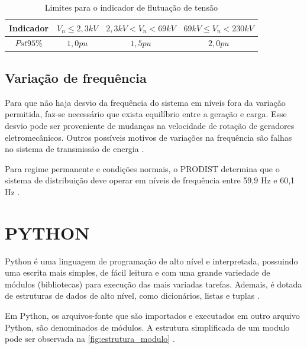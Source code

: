 \begin{table}[H]
  \centering
  \caption{Limites para o indicador de flutuação de tensão}
  \label{tab:limites_flutuacao_tensao}
  \begin{tabular}{@{}cccc@{}}
  \toprule
  \textbf{Indicador} & \textbf{$V_n \leq  2,3 kV$} & \textbf{$2,3 kV < V_n  < 69 kV$} & \textbf{$69 kV \leq V_n  < 230 kV$} \\ \midrule
  $P{st}95\%$ & $1,0 pu$ & $1,5 pu$ & $2,0 pu$ \\ \bottomrule
  \end{tabular}
\end{table}

\subsection{Variação de frequência}

Para que não haja desvio da frequência do sistema em níveis fora da variação permitida, faz-se necessário que exista equilíbrio entre a geração e carga. Esse desvio pode ser proveniente de mudanças na velocidade de rotação de geradores eletromecânicos. Outros possíveis motivos de variações na frequência são falhas no sistema de transmissão de energia \cite{ref:fuchs_2015}.

Para regime permanente e condições normais, o PRODIST determina que o sistema de distribuição deve operar em níveis de frequência entre 59,9 Hz e 60,1 Hz \cite{ref:ANEEL2021}. 


\section{PYTHON}

Python é uma linguagem de programação de alto nível e interpretada, possuindo uma escrita mais simples, de fácil leitura e com uma grande variedade de módulos (bibliotecas) para execução das mais variadas tarefas. Ademais, é dotada de estruturas de dados de alto nível, como dicionários, listas e tuplas \cite{ref:borges_2014}.

Em Python, os arquivos-fonte que são importados e executados em outro arquivo Python, são denominados de módulos. A estrutura simplificada de um modulo pode ser observada na \autoref{fig:estrutura_modulo} \cite{ref:borges_2014}.

